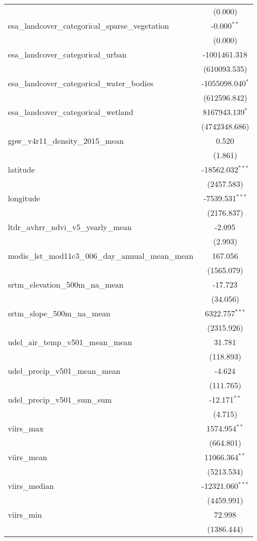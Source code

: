 \begin{table}[!htbp]
\begin{tabular}{@{\extracolsep{5pt}}lc}
  & (0.000) \\
 esa_landcover_categorical_sparse_vegetation & -0.000$^{**}$ \\
  & (0.000) \\
 esa_landcover_categorical_urban & -1001461.318$^{}$ \\
  & (610093.535) \\
 esa_landcover_categorical_water_bodies & -1055098.040$^{*}$ \\
  & (612596.842) \\
 esa_landcover_categorical_wetland & 8167943.139$^{*}$ \\
  & (4742348.686) \\
 gpw_v4r11_density_2015_mean & 0.520$^{}$ \\
  & (1.861) \\
 latitude & -18562.032$^{***}$ \\
  & (2457.583) \\
 longitude & -7539.531$^{***}$ \\
  & (2176.837) \\
 ltdr_avhrr_ndvi_v5_yearly_mean & -2.095$^{}$ \\
  & (2.993) \\
 modis_lst_mod11c3_006_day_annual_mean_mean & 167.056$^{}$ \\
  & (1565.079) \\
 srtm_elevation_500m_na_mean & -17.723$^{}$ \\
  & (34.056) \\
 srtm_slope_500m_na_mean & 6322.757$^{***}$ \\
  & (2315.926) \\
 udel_air_temp_v501_mean_mean & 31.781$^{}$ \\
  & (118.893) \\
 udel_precip_v501_mean_mean & -4.624$^{}$ \\
  & (111.765) \\
 udel_precip_v501_sum_sum & -12.171$^{**}$ \\
  & (4.715) \\
 viirs_max & 1574.954$^{**}$ \\
  & (664.801) \\
 viirs_mean & 11066.364$^{**}$ \\
  & (5213.534) \\
 viirs_median & -12321.060$^{***}$ \\
  & (4459.991) \\
 viirs_min & 72.998$^{}$ \\
  & (1386.444) \\

\end{tabular}
\end{table}
